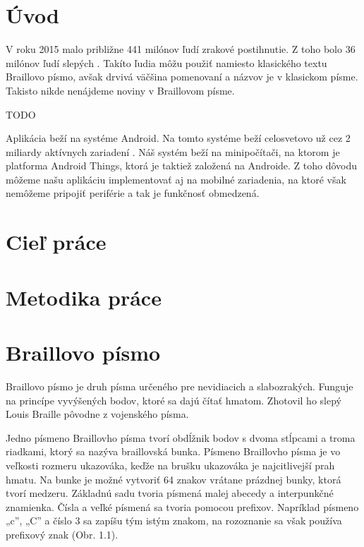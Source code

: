 \documentclass{template/socthesis}
\author{Juraj Kulich}
\begin{document}
	
\maketitle
{}

\tableofcontents

\chapter*{Úvod}
V roku 2015 malo približne 441 milónov ľudí zrakové postihnutie. Z toho bolo 36 milónov ľudí slepých \cite{bourne2017magnitude}. Takíto ľudia môžu použiť namiesto klasického textu Braillovo písmo, avšak drvivá väčšina pomenovaní a názvov je v klasickom písme. Takisto nikde nenájdeme noviny v Braillovom písme.

TODO

Aplikácia beží na systéme Android. Na tomto systéme beží celosvetovo už cez 2 miliardy aktívnych zariadení \cite{ng_2017}. Náš systém beží na minipočítači, na ktorom je platforma Android Things, ktorá je taktiež založená na Androide. Z toho dôvodu môžeme našu aplikáciu implementovať aj na mobilné zariadenia, na ktoré však nemôžeme pripojiť periférie a tak je funkčnosť obmedzená.
\newpage

\chapter*{Cieľ práce}
\newpage

\chapter*{Metodika práce}
\newpage

\chapter{Braillovo písmo}
Braillovo písmo je druh písma určeného pre nevidiacich a slabozrakých. Funguje na princípe vyvýšených bodov, ktoré sa dajú čítať hmatom. Zhotovil ho slepý Louis Braille pôvodne z vojenského písma. 

Jedno písmeno Braillovho písma tvorí obdĺžnik bodov s dvoma stĺpcami a troma riadkami, ktorý sa nazýva braillovská bunka. Písmeno Braillovho písma je vo veľkosti rozmeru ukazováka, keďže na brušku ukazováka je najcitlivejší prah hmatu.
Na bunke je možné vytvoriť 64 znakov vrátane prázdnej bunky, ktorá tvorí medzeru. 
Základnú sadu tvoria písmená malej abecedy a interpunkčné znamienka. Čísla a veľké písmená sa tvoria pomocou prefixov.  Napríklad písmeno „c”,  „C” a číslo 3 sa zapíšu tým istým znakom, na rozoznanie sa však používa prefixový znak (Obr. 1.1).
\end{document}
